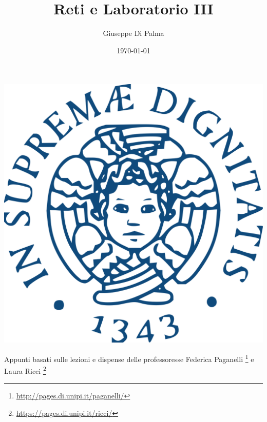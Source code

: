 \documentclass{article}
\title{Reti e Laboratorio III}
\author{Giuseppe Di Palma}
\date{\today}
\theoremstyle{definition}
\begin{document}
    
    \maketitle
    \begin{center}
        \includegraphics[scale=0.15]{Immagini/Stemma_unipi.png}
    \end{center}
    \vspace{1cm}
    \begin{center}
        Appunti basati sulle lezioni e dispense delle professoresse Federica Paganelli \footnote{\url{http://pages.di.unipi.it/paganelli/}}
        e Laura Ricci \footnote{\url{https://pages.di.unipi.it/ricci/}}
    \end{center}
    \pagebreak
    \tableofcontents
    \pagebreak

    \begin{sloppypar}

        
        
        
        

    \end{sloppypar}
\end{document}
